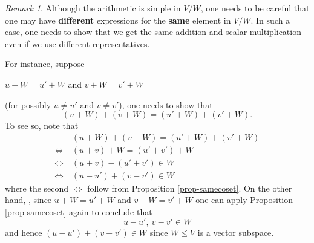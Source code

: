 \documentclass[11pt,openany]{book}
\theoremstyle{plain}
\theoremstyle{definition}
\theoremstyle{remark}
\newtheorem{remark}[remark]{Remark}
\begin{document}
\begin{remark}
    Although the arithmetic is simple in $V/W$, one needs to be careful that one may have {\bf different} expressions for the {\bf same} element in $V/W$. In such a case, one needs to show that we get the same addition and scalar multiplication even if we use different representatives.

    For instance, suppose 
    \begin{center}
        $u + W = u' + W$ \quad and \quad $v + W = v'+W$ 
    \end{center}
    (for possibly $u \neq u'$ and $v \neq v'$), one needs to show that
    $$(u+W)+(v+W) = (u'+W) + (v'+W).$$
    To see so, note that
    \begin{align*}
    &(u+W)+(v+W) = (u'+W) + (v'+W) \\
      \Leftrightarrow\ &(u+v) + W = (u'+v') +W   \\
      \Leftrightarrow\ &(u+v)-(u'+v') \in W   \\
      \Leftrightarrow\ &(u-u')+(v-v') \in W   
    \end{align*}
    where the second $\Leftrightarrow$ follow from Proposition \ref{prop-samecoset}. On the other hand,
    , since $u + W = u' + W$ and $v + W = v'+W$ one can apply Proposition \ref{prop-samecoset} again to conclude that
    $$u - u',\ v-v' \in W$$
    and hence $(u-u')+(v-v') \in W$ since $W \leq V$ is a vector subspace.
\end{remark}
\end{document}
